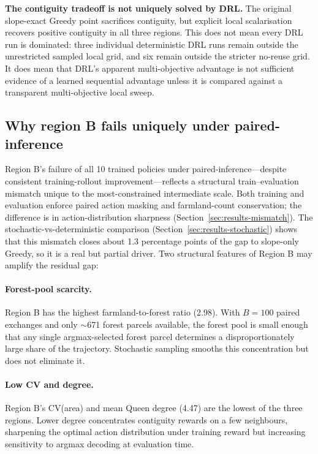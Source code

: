 \documentclass[]{interact}
\theoremstyle{plain}
\begin{document}
\textbf{The contiguity tradeoff is not uniquely solved by DRL.} The original slope-exact Greedy point sacrifices contiguity, but explicit local scalarisation recovers positive contiguity in all three regions. This does not mean every DRL run is dominated: three individual deterministic DRL runs remain outside the unrestricted sampled local grid, and six remain outside the stricter no-reuse grid. It does mean that DRL's apparent multi-objective advantage is not sufficient evidence of a learned sequential advantage unless it is compared against a transparent multi-objective local sweep.

\subsection{Why region B fails uniquely under paired-inference}\label{sec:disc-B}

Region B's failure of all 10 trained policies under paired-inference---despite consistent training-rollout improvement---reflects a structural train--evaluation mismatch unique to the most-constrained intermediate scale. Both training and evaluation enforce paired action masking and farmland-count conservation; the difference is in action-distribution sharpness (Section~\ref{sec:results-mismatch}). The stochastic-vs-deterministic comparison (Section~\ref{sec:results-stochastic}) shows that this mismatch closes about 1.3 percentage points of the gap to slope-only Greedy, so it is a real but partial driver. Two structural features of Region B may amplify the residual gap:

\paragraph{Forest-pool scarcity.} Region B has the highest farmland-to-forest ratio (2.98). With $B = 100$ paired exchanges and only $\sim$671 forest parcels available, the forest pool is small enough that any single argmax-selected forest parcel determines a disproportionately large share of the trajectory. Stochastic sampling smooths this concentration but does not eliminate it.

\paragraph{Low CV and degree.} Region B's CV(area) and mean Queen degree (4.47) are the lowest of the three regions. Lower degree concentrates contiguity rewards on a few neighbours, sharpening the optimal action distribution under training reward but increasing sensitivity to argmax decoding at evaluation time.
\end{document}
